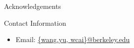 \documentclass[final]{beamer}
\newlength{\onecolwid}
\begin{document}
\begin{frame}[t]
\begin{columns}[t]
\begin{column}{\onecolwid}
\begin{block}{Acknowledgements}
\end{block}







\begin{block}{Contact Information}

\begin{itemize}
\item Email: \href{mailto:wang.yu@berkeley.edu, wcai@berkeley.edu}{\{wang.yu, wcai\}@berkeley.edu}
\end{itemize}


\end{block}


\end{column} %

\end{columns} %

\end{frame} %
\end{document}
